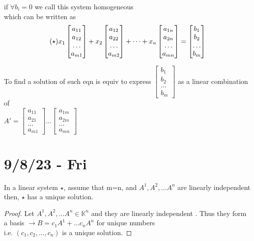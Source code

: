 \documentclass{article}
\newcommand\m[1]{\begin{bmatrix}#1\end{bmatrix}}
\newcommand{\li}{linearly independent }
\begin{document}
if $\forall b_i=0$ we call this system homogeneous\\which can be written as
\begin{equation*}
    (\star) \hfill  x_1\m{a_{11}\\a_{12}\\\dots\\ a_{m1}}+x_2\m{a_{12}\\a_{22}\\\dots\\ a_{m2}}+\dots+x_n\m{a_{1n}\\a_{2n}\\\dots\\ a_{mn}}=\m{b_1\\b_2\\\dots\\b_m}
\end{equation*}

To find a solution of such eqn is equiv to express $\m{b_1\\b_2\\\dots\\b_m}$
as a linear combination of \\$A'=\m{a_{11}\\a_{21}\\\dots\\a_{m1}}\dots \m{a_{1m}\\a_{2m}\\\dots\\a_{mn}}$
\section{9/8/23 - Fri}
\begin{theorem}
    In a linear system $\star$, assume that m=n, and $A^1,A^2,\dots A^n$ are \li then, $\star$ has a unique solution.
\end{theorem}
\begin{proof}
    Let $A^1,A^2,\dots A^n \in \mathbb{K}^n$ and they are \li. Thus they form a basis $\to B=c_1A^1+\dots c_nA^n$ for unique numbers\\
    i.e. $(c_1,c_2,\dots,c_n)$ is a unique solution.
\end{proof}
\end{document}
